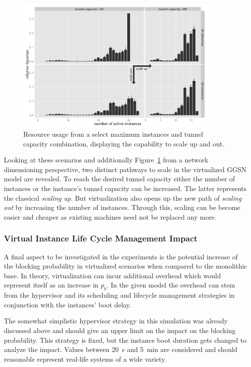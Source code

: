 \begin{figure}[htbp]
	\centering
	\includegraphics[width=0.9\textwidth]{images/R-virtualized-instanceuse-barplot.pdf}
	\caption{Resource usage from a select maximum instances and tunnel capacity combination, displaying the capability to scale up and out.}
\label{c4:fig:res-usage-barplot}
\end{figure}


Looking at these scenarios and additionally Figure~\ref{c4:fig:res-usage-barplot} from a network dimensioning perspective, two distinct pathways to scale in the virtualized \gls{GGSN} model are revealed. To reach the desired tunnel capacity either the number of instances or the instance's tunnel capacity can be increased. The latter represents the classical \textit{scaling up}. But virtualization also opens up the new path of \textit{scaling out} by increasing the number of instances. Through this, scaling can be become easier and cheaper as existing machines need not be replaced any more.


\subsubsection{Virtual Instance Life Cycle Management Impact}

A final aspect to be investigated in the experiments is the potential increase of the blocking probability in virtualized scenarios when compared to the monolithic base. In theory, virtualization can incur additional overhead which would represent itself as an increase in $p_b$. In the given model the overhead can stem from the hypervisor and its scheduling  and lifecycle management strategies in conjunction with the instances' boot delay. 

The somewhat simplistic hypervisor strategy in this simulation was already discussed above and should give an upper limit on the impact on the blocking probability. This strategy is fixed, but the instance boot duration gets changed to analyze the impact. Values between \SI{20}{\second} and \SI{5}{\minute} are considered and should reasonable represent real-life systems of a wide variety.

